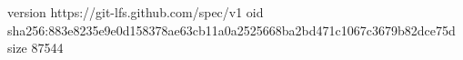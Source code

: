 version https://git-lfs.github.com/spec/v1
oid sha256:883e8235e9e0d158378ae63cb11a0a2525668ba2bd471c1067c3679b82dce75d
size 87544

